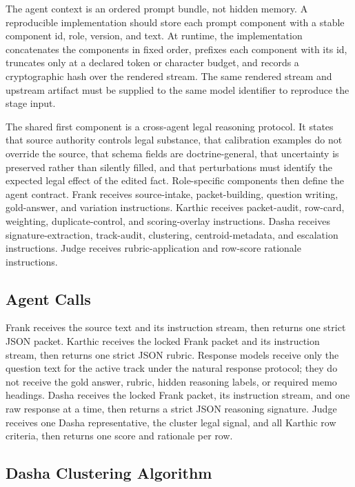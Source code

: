 The agent context is an ordered prompt bundle, not hidden memory. A reproducible
implementation should store each prompt component with a stable component id,
role, version, and text. At runtime, the implementation concatenates the
components in fixed order, prefixes each component with its id, truncates only at
a declared token or character budget, and records a cryptographic hash over the
rendered stream. The same rendered stream and upstream artifact must be supplied
to the same model identifier to reproduce the stage input.

The shared first component is a cross-agent legal reasoning protocol. It states
that source authority controls legal substance, that calibration examples do not
override the source, that schema fields are doctrine-general, that uncertainty is
preserved rather than silently filled, and that perturbations must identify the
expected legal effect of the edited fact. Role-specific components then define
the agent contract. Frank receives source-intake, packet-building, question
writing, gold-answer, and variation instructions. Karthic receives packet-audit,
row-card, weighting, duplicate-control, and scoring-overlay instructions. Dasha
receives signature-extraction, track-audit, clustering, centroid-metadata, and
escalation instructions. Judge receives rubric-application and row-score
rationale instructions.

\subsection{Agent Calls}

Frank receives the source text and its instruction stream, then returns one
strict JSON packet. Karthic receives the locked Frank packet and its instruction
stream, then returns one strict JSON rubric. Response models receive only the
question text for the active track under the natural response protocol; they do
not receive the gold answer, rubric, hidden reasoning labels, or required memo
headings. Dasha receives the locked Frank packet, its instruction stream, and one
raw response at a time, then returns a strict JSON reasoning signature. Judge
receives one Dasha representative, the cluster legal signal, and all Karthic row
criteria, then returns one score and rationale per row.

\subsection{Dasha Clustering Algorithm}


